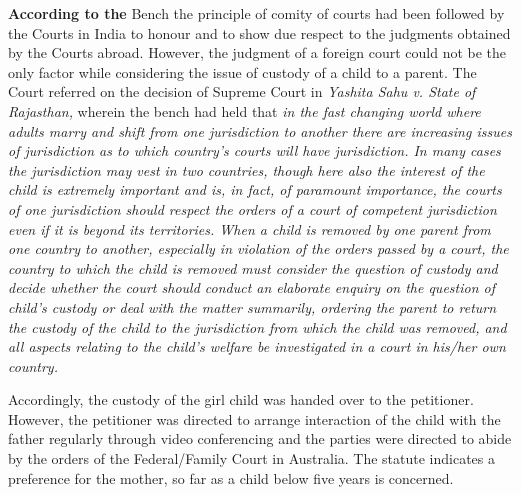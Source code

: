 \begin{multicols}{2}
\noi
\textbf{According to the} Bench the principle of comity of courts had been followed by the Courts in
India to honour and to show due respect to the judgments obtained by the Courts abroad.
However, the judgment of a foreign court could not be the only factor while considering the issue
of custody of a child to a parent. The Court referred on the decision of Supreme Court in \textit{Yashita
Sahu v. State of Rajasthan,} wherein the bench had held that \textit{in the fast changing world where
adults marry and shift from one jurisdiction to another there are increasing issues of jurisdiction
as to which country’s courts will have jurisdiction. In many cases the jurisdiction may vest in two
countries, though here also the interest of the child is extremely important and is, in fact, of
paramount importance, the courts of one jurisdiction should respect the orders of a court of
competent jurisdiction even if it is beyond its territories. When a child is removed by one parent
from one country to another, especially in violation of the orders passed by a court, the country
to which the child is removed must consider the question of custody and decide whether the court
should conduct an elaborate enquiry on the question of child’s custody or deal with the matter
summarily, ordering the parent to return the custody of the child to the jurisdiction from which
the child was removed, and all aspects relating to the child’s welfare be investigated in a court
in his/her own country.}

\vspace{-.15cm}

\noi
Accordingly, the custody of the girl child was handed over to the petitioner. However, the
petitioner was directed to arrange interaction of the child with the father regularly through video
conferencing and the parties were directed to abide by the orders of the Federal/Family Court in Australia. The statute indicates a preference for the mother, so far as a child below five years is
concerned.


\end{multicols}
